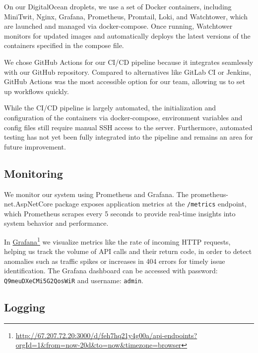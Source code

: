 \documentclass[12pt,a4paper,reqno]{report}
\begin{document}
On our DigitalOcean droplets, we use a set of Docker containers, including MiniTwit, Nginx, Grafana, Prometheus, Promtail, Loki, and Watchtower, which are launched and managed via docker-compose. Once running, Watchtower monitors for updated images and automatically deploys the latest versions of the containers specified in the compose file.

We chose GitHub Actions for our CI/CD pipeline because it integrates seamlessly with our GitHub repository. Compared to alternatives like GitLab CI or Jenkins, GitHub Actions was the most accessible option for our team, allowing us to set up workflows quickly.

While the CI/CD pipeline is largely automated, the initialization and configuration of the containers via docker-compose, environment variables and config files still require manual SSH access to the server. Furthermore, automated testing has not yet been fully integrated into the pipeline and remains an area for future improvement.

\subsection{Monitoring}

We monitor our system using Prometheus and Grafana. The prometheus-net.AspNetCore package exposes application metrics at the \texttt{/metrics} endpoint, which Prometheus scrapes every 5 seconds to provide real-time insights into system behavior and performance.

In \href{http://67.207.72.20:3000/d/feh7hq21y4g00a/api-endpoints?orgId=1&from=now-20d&to=now&timezone=browser}{Grafana}\footnote{\label{grafana-footnote}\url{http://67.207.72.20:3000/d/feh7hq21y4g00a/api-endpoints?orgId=1&from=now-20d&to=now&timezone=browser}} we visualize metrics like the rate of incoming HTTP requests, helping us track the volume of API calls and their return code, in order to detect anomalies such as traffic spikes or increases in 404 errors for timely issue identification. The Grafana dashboard can be accessed with password: \texttt{Q9meuDXeCMi5G2QosWiR} and username: \texttt{admin}.

\subsection{Logging}
\end{document}
